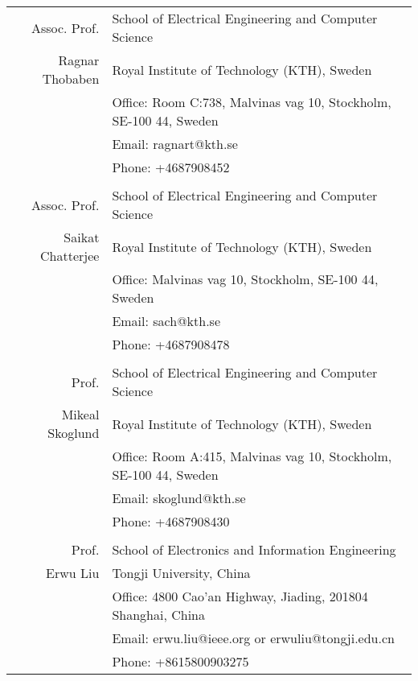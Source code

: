 \documentclass[a4paper,10pt]{article}
\begin{document}
\begin{longtable}[H]{r|p{13.5cm}}
  Assoc. Prof. & School of Electrical Engineering and Computer Science\\
  Ragnar Thobaben &Royal Institute of Technology (KTH), Sweden \\
   & Office: Room C:738, Malvinas vag 10, Stockholm, SE-100 44, Sweden \\
               & Email: ragnart@kth.se \\
               & Phone: +4687908452 \\

  \multicolumn{2}{c}{} \\
    Assoc. Prof. & School of Electrical Engineering and Computer Science\\
 Saikat Chatterjee &Royal Institute of Technology (KTH), Sweden \\
   & Office: Malvinas vag 10, Stockholm, SE-100 44, Sweden \\
               & Email: sach@kth.se \\
               & Phone: +4687908478 \\

  \multicolumn{2}{c}{} \\

  Prof.  & School of Electrical Engineering and Computer Science \\
  Mikeal Skoglund &Royal Institute of Technology (KTH), Sweden \\
   & Office: Room A:415, Malvinas vag 10, Stockholm, SE-100 44, Sweden \\
               & Email: skoglund@kth.se \\
               & Phone: +4687908430 \\

  \multicolumn{2}{c}{} \\
  Prof. & School of Electronics and Information Engineering \\
  Erwu Liu &Tongji University, China \\
               & Office: 4800 Cao'an Highway, Jiading, 201804 Shanghai, China\\
                  & Email: erwu.liu@ieee.org or erwuliu@tongji.edu.cn \\
               & Phone: +8615800903275
\end{longtable}
\end{document}
